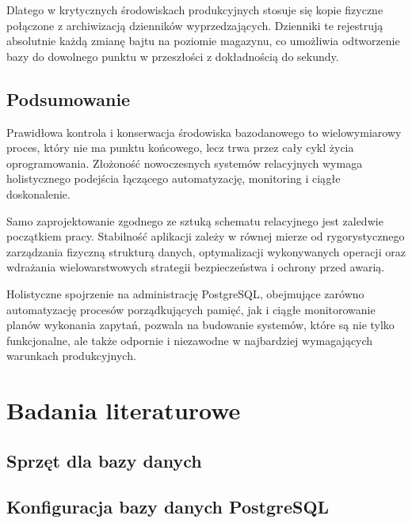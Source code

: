 \documentclass[letterpaper,10pt,english]{sphinxmanual}
\begin{document}
\sphinxAtStartPar
Dlatego w krytycznych środowiskach produkcyjnych stosuje się kopie fizyczne połączone z archiwizacją dzienników wyprzedzających. Dzienniki te rejestrują absolutnie każdą zmianę bajtu na poziomie magazynu, co umożliwia odtworzenie bazy do dowolnego punktu w przeszłości z dokładnością do sekundy.


\section{Podsumowanie}
\label{\detokenize{rozdzial_1/index:podsumowanie}}
\sphinxAtStartPar
Prawidłowa kontrola i konserwacja środowiska bazodanowego to wielowymiarowy proces, który nie ma punktu końcowego, lecz trwa przez cały cykl życia oprogramowania. Złożoność nowoczesnych systemów relacyjnych wymaga holistycznego podejścia łączącego automatyzację, monitoring i ciągłe doskonalenie.

\sphinxAtStartPar
Samo zaprojektowanie zgodnego ze sztuką schematu relacyjnego jest zaledwie początkiem pracy. Stabilność aplikacji zależy w równej mierze od rygorystycznego zarządzania fizyczną strukturą danych, optymalizacji wykonywanych operacji oraz wdrażania wielowarstwowych strategii bezpieczeństwa i ochrony przed awarią.

\sphinxAtStartPar
Holistyczne spojrzenie na administrację PostgreSQL, obejmujące zarówno automatyzację procesów porządkujących pamięć, jak i ciągłe monitorowanie planów wykonania zapytań, pozwala na budowanie systemów, które są nie tylko funkcjonalne, ale także odpornie i niezawodne w najbardziej wymagających warunkach produkcyjnych.

\sphinxstepscope


\chapter{Badania literaturowe}
\label{\detokenize{rozdzial_2/index:badania-literaturowe}}\label{\detokenize{rozdzial_2/index::doc}}
\sphinxstepscope


\section{Sprzęt dla bazy danych}
\label{\detokenize{rozdzial_2/rozdzial_21/index:sprzet-dla-bazy-danych}}\label{\detokenize{rozdzial_2/rozdzial_21/index::doc}}
\sphinxstepscope


\section{Konfiguracja bazy danych PostgreSQL}
\label{\detokenize{rozdzial_2/rozdzial_22/index:konfiguracja-bazy-danych-postgresql}}\label{\detokenize{rozdzial_2/rozdzial_22/index::doc}}
\end{document}
